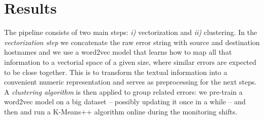 \chapter{Results}

The pipeline consists of 
two main steps: \textit{i)} vectorization and \textit{ii)} clustering.
In the {\emph{vectorization step}} we concatenate the raw error string with source and destination hostnames and we use a word2vec model that learns how to map all that information to a vectorial space of a given size, where similar errors are expected to be close together. This is to transform the textual information into a convenient numeric representation and serves as preprocessing for the next steps. 
A {\emph{clustering algorithm}} is then applied to group related errors: 
we pre-train a word2vec model on a big dataset 
-- possibly updating it once in a while -- and then 
and run a \mbox{K-Means++} algorithm \cite{kmeans} online during the monitoring shifts.  
% 

